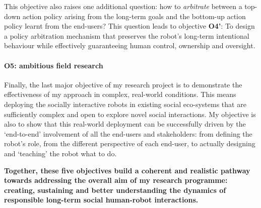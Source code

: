 This objective also raises one additional question: how to \emph{arbitrate}
between a top-down action policy arising from the long-term goals and the
bottom-up action policy learnt from the end-users? This question leads to
objective {\bf O4'}: To design a policy arbitration mechanism that preserves the
robot's long-term intentional behaviour while effectively guaranteeing human
control, ownership and oversight.

\paragraph{\bf O5: ambitious field research} Finally, the last major objective
of my research project is to demonstrate the effectiveness of my approach in
complex, real-world conditions. This means deploying the socially interactive
robots in existing social eco-systems that are sufficiently complex and open to
explore novel social interactions. My objective is also to show that this
real-world deployment can be successfully driven by the `end-to-end' involvement
of all the end-users and stakeholders: from defining the robot's role, from the
different perspective of each end-user, to actually designing and `teaching' the
robot what to do.

\begin{framed}

\noindent\bf Together, these five objectives build a coherent and realistic
pathway towards addressing the overall aim of my research programme:
creating, sustaining and better understanding the dynamics of responsible
long-term social human-robot interactions.

\end{framed}







